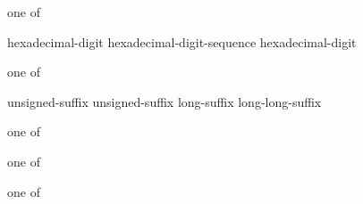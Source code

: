 \begin{bnf}
 \textnormal{one of}\br
\end{bnf}

\begin{bnf}
\br
    hexadecimal-digit\br
    hexadecimal-digit-sequence  hexadecimal-digit
\end{bnf}

\begin{bnf}
 \textnormal{one of}\br
    \br
    \br
\end{bnf}

\begin{bnf}
\br
    unsigned-suffix  \br
    unsigned-suffix  \br
    long-suffix  \br
    long-long-suffix 
\end{bnf}

\begin{bnf}
 \textnormal{one of}\br
\end{bnf}

\begin{bnf}
 \textnormal{one of}\br
\end{bnf}

\begin{bnf}
 \textnormal{one of}\br
\end{bnf}

